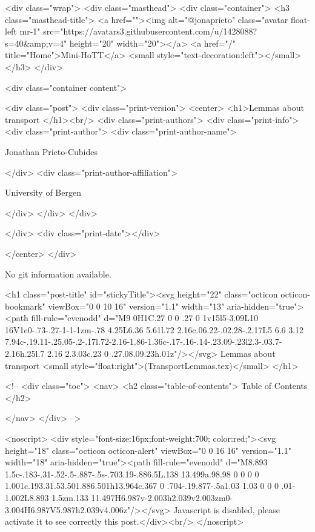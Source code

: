     <div class="wrap">
      <div class="masthead">
        <div class="container">
          <h3 class="masthead-title">
            <a href=""><img alt="@jonaprieto" class="avatar float-left mr-1" src="https://avatars3.githubusercontent.com/u/1428088?s=40&amp;v=4" height="20" width="20"></a>
            <a href="/" title="Home">Mini-HoTT</a>
            <small style="text-decoration:left"></small>
          </h3>
        </div>
      
      <div class="container content">
        







<div class="post">
  <div class="print-version">
    <center>
      <h1>Lemmas about transport </h1><br/>
        <div class="print-authors">
          <div class="print-info">
            <div class="print-author">
              <div class="print-author-name">
                
                  Jonathan Prieto-Cubides
                
              </div>
              <div class="print-author-affiliation">
                
                  University of Bergen
                
                </div>
            </div>
          </div>
          
          
        </div>
        <div class="print-date"></div>
        
        
    </center>
  </div>

  
  No git information available.
  

  <h1 class="post-title" id="stickyTitle"><svg height="22" class="octicon octicon-bookmark" viewBox="0 0 10 16" version="1.1" width="13" aria-hidden="true"><path fill-rule="evenodd" d="M9 0H1C.27 0 0 .27 0 1v15l5-3.09L10 16V1c0-.73-.27-1-1-1zm-.78 4.25L6.36 5.61l.72 2.16c.06.22-.02.28-.2.17L5 6.6 3.12 7.94c-.19.11-.25.05-.2-.17l.72-2.16-1.86-1.36c-.17-.16-.14-.23.09-.23l2.3-.03.7-2.16h.25l.7 2.16 2.3.03c.23 0 .27.08.09.23h.01z"/></svg> Lemmas about transport  <small style="float:right">(TransportLemmas.tex)</small>
  </h1>

  <!-- 
  <div class="toc">
    <nav>
    <h2 class="table-of-contents"> Table of Contents </h2>
      

    </nav>
  </div>
   -->

  <noscript>
  <div style="font-size:16px;font-weight:700; color:red;"><svg height="18" class="octicon octicon-alert" viewBox="0 0 16 16" version="1.1" width="18" aria-hidden="true"><path fill-rule="evenodd" d="M8.893 1.5c-.183-.31-.52-.5-.887-.5s-.703.19-.886.5L.138 13.499a.98.98 0 0 0 0 1.001c.193.31.53.501.886.501h13.964c.367 0 .704-.19.877-.5a1.03 1.03 0 0 0 .01-1.002L8.893 1.5zm.133 11.497H6.987v-2.003h2.039v2.003zm0-3.004H6.987V5.987h2.039v4.006z"/></svg> Javascript is disabled, please activate it to see correctly this post.</div><br/>
  </noscript>

